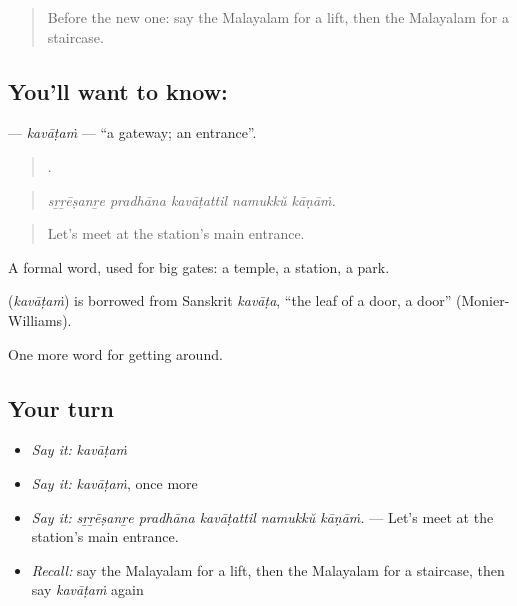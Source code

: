 \label{lesson:ML-C485-kavatam}



\begin{quote}
Before the new one: say the Malayalam for a lift, then the Malayalam for a staircase.
\end{quote}

\subsection*{You'll want to know: }
\textbf{} — \emph{kavāṭaṁ} — \textquotedblleft{}a gateway; an entrance\textquotedblright{}.

\begin{quote}
    .
\end{quote}

\begin{quote}
\emph{sṟṟēṣanṟe pradhāna kavāṭattil namukkŭ kāṇāṁ.}
\end{quote}

\begin{quote}
Let's meet at the station's main entrance.
\end{quote}

A formal word, used for big gates: a temple, a station, a park.

\begin{cousinweb}
\textbf{} (\emph{kavāṭaṁ}) is borrowed from Sanskrit \emph{kavāṭa}, \textquotedblleft{}the leaf of a door, a door\textquotedblright{} (Monier-Williams).
\end{cousinweb}

\begin{grammarlens}[title={What you've built}]
One more word for getting around.
\end{grammarlens}

\subsection*{Your turn}
\begin{itemize}
\raggedright
  \item \emph{Say it:} \emph{kavāṭaṁ}
  \item \emph{Say it:} \emph{kavāṭaṁ}, once more
  \item \emph{Say it:} \emph{sṟṟēṣanṟe pradhāna kavāṭattil namukkŭ kāṇāṁ.} — Let's meet at the station's main entrance.
  \item \emph{Recall:} say the Malayalam for a lift, then the Malayalam for a staircase, then say \emph{kavāṭaṁ} again
\end{itemize}


